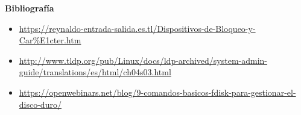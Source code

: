 \documentclass[11pt, a4paper]{report}
\begin{document}
\newpage

\textbf{Bibliografía} \\

\begin{itemize}

\item  \url{https://reynaldo-entrada-salida.es.tl/Dispositivos-de-Bloqueo-y-Car%E1cter.htm}

\item \url{http://www.tldp.org/pub/Linux/docs/ldp-archived/system-admin-guide/translations/es/html/ch04s03.html}

\item \url{https://openwebinars.net/blog/9-comandos-basicos-fdisk-para-gestionar-el-disco-duro/}

\end{itemize}
\end{document}
